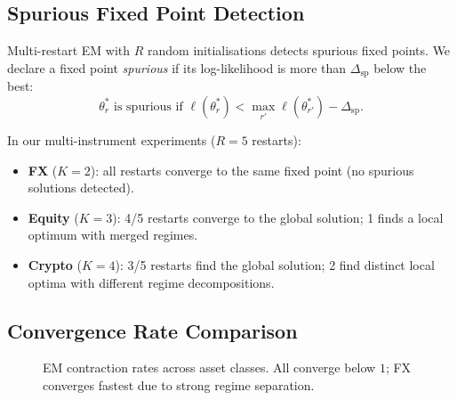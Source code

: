 \documentclass[11pt]{article}
\begin{document}
\subsection{Spurious Fixed Point Detection}

Multi-restart EM with $R$ random initialisations detects spurious
fixed points.  We declare a fixed point \emph{spurious} if its
log-likelihood is more than $\Delta_{\mathrm{sp}}$ below the best:
\begin{equation}
  \theta^*_r \text{ is spurious if }
  \ell(\theta^*_r) < \max_{r'} \ell(\theta^*_{r'}) -
  \Delta_{\mathrm{sp}}.
\end{equation}

In our multi-instrument experiments ($R{=}5$ restarts):
\begin{itemize}[nosep]
  \item \textbf{FX} ($K{=}2$): all restarts converge to the same
        fixed point (no spurious solutions detected).
  \item \textbf{Equity} ($K{=}3$): 4/5 restarts converge to the
        global solution; 1 finds a local optimum with merged regimes.
  \item \textbf{Crypto} ($K{=}4$): 3/5 restarts find the global
        solution; 2 find distinct local optima with different regime
        decompositions.
\end{itemize}

\subsection{Convergence Rate Comparison}

\begin{figure}[h]
\centering
{}
\caption{EM contraction rates across asset classes.  All converge
below $1$; FX converges fastest due to strong regime
separation.}\label{fig:contraction}
\end{figure}
\end{document}
